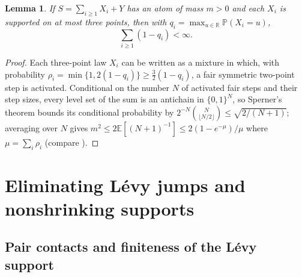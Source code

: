 \documentclass[11pt]{article}
\numberwithin{equation}{section}
\newtheorem{lemma}[theorem]{Lemma}
\theoremstyle{definition}
\newcommand{\E}{\mathbb E}
\newcommand{\Pp}{\mathbb P}
\newcommand{\R}{\mathbb R}
\begin{document}
\begin{lemma}\label{lem:atoms-modal}
If $S=\sum_{i\ge1}X_i+Y$ has an atom of mass $m>0$ and each $X_i$ is
supported on at most three points, then with $q_i=\max_{u\in\R}\Pp(X_i=u)$,
\[
                         \sum_{i\ge1}(1-q_i)<\infty.
\]
\end{lemma}
\begin{proof}
Each three-point law $X_i$ can be written as a mixture in which, with
probability $\rho_i=\min\{1,2(1-q_i)\}\ge\frac32(1-q_i)$, a fair symmetric
two-point step is activated. Conditional on the number $N$ of activated fair
steps and their step sizes, every level set of the sum is an antichain in
$\{0,1\}^N$, so Sperner's theorem \citep{Sperner1928} bounds its conditional
probability by $2^{-N}\binom{N}{\lfloor N/2\rfloor}\le\sqrt{2/(N+1)}$;
averaging over $N$ gives $m^2\le2\E[(N+1)^{-1}]\le2(1-e^{-\mu})/\mu$ where
$\mu=\sum_i\rho_i$ (compare \citet{JessenWintner1935}).
\end{proof}

\section{Eliminating L\'evy jumps and nonshrinking supports}\label{sec:propagation}

\subsection{Pair contacts and finiteness of the L\'evy support}
\end{document}
